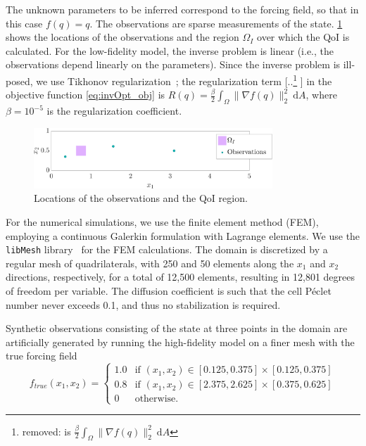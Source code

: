 \documentclass[review]{siamart0516}
\newcommand{\red}[1]{{\color{red}{#1}}}
\providecommand{\DIFaddtex}[1]{{\protect\color{blue} \sf #1}} %
\providecommand{\DIFdeltex}[1]{{\protect\color{red} [..\footnote{removed: #1} ]}} %
\providecommand{\DIFaddbegin}{} %
\providecommand{\DIFaddend}{} %
\providecommand{\DIFdelbegin}{} %
\providecommand{\DIFdelend}{} %
\providecommand{\DIFadd}[1]{\texorpdfstring{\DIFaddtex{#1}}{#1}} %
\providecommand{\DIFdel}[1]{\texorpdfstring{\DIFdeltex{#1}}{}} %
\newcommand{\DIFscaledelfig}{0.5}
\newlength{\DIFdelgraphicswidth} %
\newlength{\DIFdelgraphicsheight} %
\newcommand{\DIFaddincludegraphics}[2][]{{\color{blue}\fbox{\DIFOincludegraphics[#1]{#2}}}} %
\newcommand{\DIFdelincludegraphics}[2][]{%
\sbox{\DIFdelgraphicsbox}{\DIFOincludegraphics[#1]{#2}}%
\settoboxwidth{\DIFdelgraphicswidth}{\DIFdelgraphicsbox} %
\settoboxtotalheight{\DIFdelgraphicsheight}{\DIFdelgraphicsbox} %
\scalebox{\DIFscaledelfig}{%
\parbox[b]{\DIFdelgraphicswidth}{\usebox{\DIFdelgraphicsbox}\\[-\baselineskip] \rule{\DIFdelgraphicswidth}{0em}}\llap{\resizebox{\DIFdelgraphicswidth}{\DIFdelgraphicsheight}{%
\setlength{\unitlength}{\DIFdelgraphicswidth}%
\begin{picture}(1,1)%
\thicklines\linethickness{2pt} %
{\color[rgb]{1,0,0}\put(0,0){\framebox(1,1){}}}%
{\color[rgb]{1,0,0}\put(0,0){\line( 1,1){1}}}%
{\color[rgb]{1,0,0}\put(0,1){\line(1,-1){1}}}%
\end{picture}%
}\hspace*{3pt}}} %
} %
\DeclareRobustCommand{\DIFaddbegin}{\DIFOaddbegin \let\includegraphics\DIFaddincludegraphics} %
\DeclareRobustCommand{\DIFaddend}{\DIFOaddend \let\includegraphics\DIFOincludegraphics} %
\DeclareRobustCommand{\DIFdelbegin}{\DIFOdelbegin \let\includegraphics\DIFdelincludegraphics} %
\DeclareRobustCommand{\DIFdelend}{\DIFOaddend \let\includegraphics\DIFOincludegraphics} %
\begin{document}
The unknown parameters to be inferred correspond to the forcing field, so that in this case $f(q)=q$. The observations are sparse measurements of the state.
\cref{fig:baseSetup} shows the locations of the observations and the region $\Omega_I$ over which the QoI is calculated. For the low-fidelity model, the inverse problem is linear (i.e., the observations depend linearly on the parameters). Since the inverse problem is ill-posed, we use Tikhonov regularization~\cite{EngHanNeu00}; the regularization term \DIFdelbegin \DIFdel{is $\frac{\beta}{2}\int_\Omega \|\nabla f(q)\|_2^2\:\textrm{d}A$}\DIFdelend \DIFaddbegin \DIFadd{in the objective function }\cref{eq:invOpt_obj} \DIFadd{is $R(q)=\frac{\beta}{2}\int_\Omega \|\nabla f(q)\|_2^2\:\textrm{d}A$}\DIFaddend , where $\beta=10^{-5}$ is the regularization coefficient.
%
\begin{figure}[htbp]
\centering
\includegraphics[width=0.8\textwidth]{baseSeries/setup_3_3.pdf}
\caption{Locations of the observations and the QoI region.}
\label{fig:baseSetup}
\end{figure}
%

For the numerical simulations, we use the finite element method (FEM), employing a continuous Galerkin formulation with Lagrange elements. We use the \texttt{libMesh} library~\cite{libMeshPaper} for the FEM calculations.
The domain is discretized by a regular mesh of quadrilaterals, with 250 and 50 elements along the $x_1$ and $x_2$ directions, respectively, for a total of 12,500 elements, resulting in 12,801 degrees of freedom per variable. The diffusion coefficient is such that the cell P\'{e}clet number never exceeds 0.1, and thus no stabilization is required.

Synthetic observations consisting of the state at three points in the domain are artificially generated by running the high-fidelity model on a finer mesh with the true forcing field
%
\begin{equation}
f_{true}(x_1,x_2)=
\begin{cases}
1.0 & \textrm{if }(x_1,x_2)\in[0.125,0.375]\times[0.125,0.375] \\
0.8 & \textrm{if }(x_1,x_2)\in[2.375,2.625]\times[0.375,0.625] \\
0 & \textrm{otherwise}.
\end{cases}
\end{equation}
%
%
\end{document}
